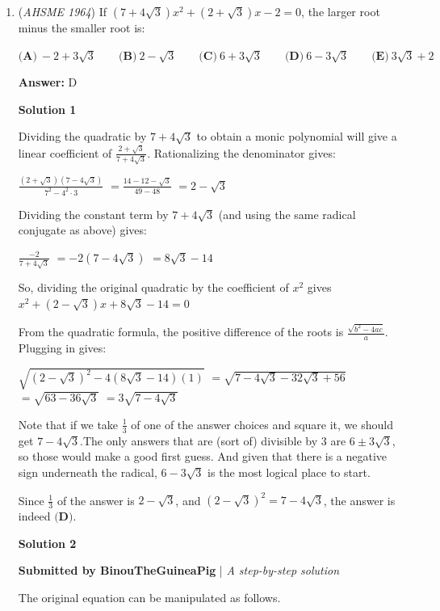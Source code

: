 \begin{enumerate}
 


	\item (\textit{AHSME 1964}) If $(7+4\sqrt{3})x^2+(2+\sqrt{3})x-2=0$, the larger root minus the smaller root is:


 $\textbf{(A)}\ -2+3\sqrt{3}\qquad \textbf{(B)}\ 2-\sqrt{3}\qquad \textbf{(C)}\ 6+3\sqrt{3}\qquad \textbf{(D)}\ 6-3\sqrt{3}\qquad \textbf{(E)}\ 3\sqrt{3}+2$

 \textbf{Answer: }D



\textbf{Solution 1}

Dividing the quadratic by $7 + 4\sqrt{3}$ to obtain a monic polynomial will give a linear coefficient of $\frac{2 + \sqrt{3}}{7 + 4\sqrt{3}}$.  Rationalizing the denominator gives:

 $\frac{(2 + \sqrt{3})(7 - 4\sqrt{3})}{7^2 - 4^2 \cdot 3}$
$=\frac{14 - 12 - \sqrt{3}}{49-48}$
$=2 - \sqrt{3}$

 Dividing the constant term by $7 + 4\sqrt{3}$ (and using the same radical conjugate as above) gives:

 $\frac{-2}{7 + 4\sqrt{3}}$
$=-2(7 - 4\sqrt{3})$
$=8\sqrt{3} - 14$

 So, dividing the original quadratic by the coefficient of $x^2$ gives $x^2 + (2 - \sqrt{3})x + 8\sqrt{3} - 14 = 0$

 From the quadratic formula, the positive difference of the roots is $\frac{\sqrt{b^2 - 4ac}}{a}$.  Plugging in gives:

 $\sqrt{(2 - \sqrt{3})^2 - 4(8\sqrt{3} - 14)(1)}$
$=\sqrt{7 - 4\sqrt{3} - 32\sqrt{3} + 56}$
$=\sqrt{63 - 36\sqrt{3}}$
$=3\sqrt{7 - 4\sqrt{3}}$

 Note that if we take $\frac{1}{3}$ of one of the answer choices and square it, we should get $7 - 4\sqrt{3}$.The only answers that are (sort of) divisible by $3$ are $6 \pm 3\sqrt{3}$, so those would make a good first guess.  And given that there is a negative sign underneath the radical, $6 - 3\sqrt{3}$ is the most logical place to start.

 Since $\frac{1}{3}$ of the answer is $2 - \sqrt{3}$, and $(2 - \sqrt{3})^2 = 7 - 4\sqrt{3}$, the answer is indeed $\boxed{\textbf{(D)}}$.

 



\textbf{Solution 2}

\textbf{Submitted by BinouTheGuineaPig} | \textit{A step-by-step solution}

 The original equation can be manipulated as follows.


\end{enumerate}

